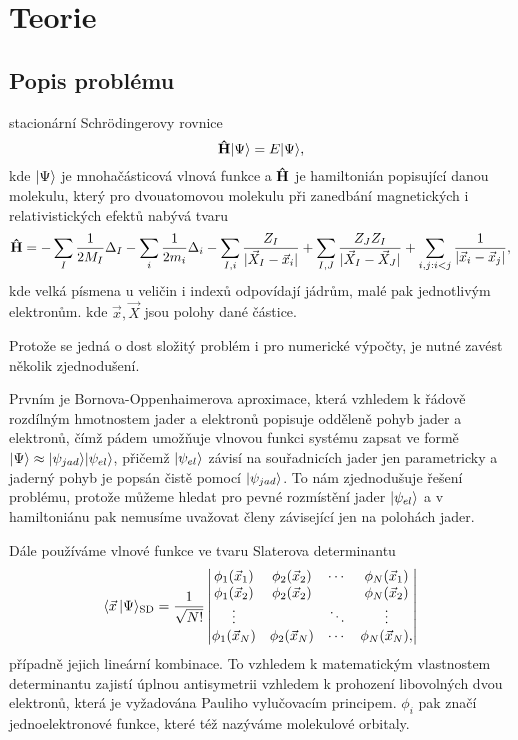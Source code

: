 \chapter{Teorie}
\section{Popis problému}
\label{approx}
stacionární Schrödingerovy rovnice
\begin{equation}
\mathbf{\hat{H}}| \Psi \rangle = E| \Psi \rangle,
\end{equation}
kde $| \Psi \rangle$ je mnohačásticová vlnová funkce a $\mathbf{\hat{H}}$ je hamiltonián popisující 
danou molekulu, který pro dvouatomovou molekulu při zanedbání magnetických i relativistických efektů nabývá tvaru
\begin{equation}
\mathbf{\hat{H}} =-\sum_{I}\frac{1}{2M_I}\Delta_I 
-\sum_{i}\frac{1}{2m_i}\Delta_i
 -\sum_{I,i} \frac{Z_{I}}{|\vec{X}_I - \vec{x}_i|}
 +\sum_{I,J} \frac{Z_{J}Z_{I}}{|\vec{X}_I - \vec{X}_J|} 
 +\sum_{i,j:i<j} \frac{1}{|\vec{x}_i - \vec{x}_j|},
\end{equation}
kde velká písmena u veličin i indexů odpovídají jádrům, malé pak jednotlivým 
elektronům. kde $\vec{x}, \vec{X}$ jsou polohy 
dané částice.

Protože se jedná o dost složitý problém i pro numerické výpočty, je nutné zavést 
několik zjednodušení. 

Prvním je Bornova-Oppenhaimerova aproximace, která vzhledem k řádově 
rozdílným hmotnostem jader a elektronů popisuje odděleně pohyb jader a elektronů, čímž 
pádem umožňuje vlnovou funkci systému zapsat ve formě $| \Psi \rangle \approx 
| \psi_{jad} \rangle| \psi_{el} \rangle$, přičemž $| \psi_{el} \rangle$ závisí na souřadnicích 
jader jen parametricky a jaderný pohyb je popsán čistě pomocí $| \psi_{jad} \rangle$.
To nám zjednodušuje řešení problému, protože můžeme hledat pro pevné rozmístění jader 
$| \psi_{el} \rangle$ a v hamiltoniánu pak nemusíme uvažovat členy závisející jen na 
polohách jader.

Dále používáme vlnové funkce ve tvaru Slaterova determinantu
\begin{equation}
\langle \vec{x}\, | \Psi \rangle_{\mathrm{SD}} = \frac{1}{\sqrt{N!}}\begin{vmatrix}
\phi_1(\vec{x}_1) & \phi_2(\vec{x}_2)& \cdots & \phi_N(\vec{x}_1) \\
\phi_1(\vec{x}_2) & \phi_2(\vec{x}_2)&        & \phi_N(\vec{x}_2)\\
\vdots         &               & \ddots & \vdots \\
\phi_1(\vec{x}_N) & \phi_2(\vec{x}_N)& \cdots & \phi_N(\vec{x}_N),
\end{vmatrix}
\end{equation}
případně jejich lineární kombinace. To vzhledem k matematickým vlastnostem determinantu zajistí úplnou antisymetrii  vzhledem k prohození libovolných dvou elektronů, která je vyžadována Pauliho vylučovacím principem. $\phi_i$ pak značí jednoelektronové funkce, které též nazýváme molekulové orbitaly.

